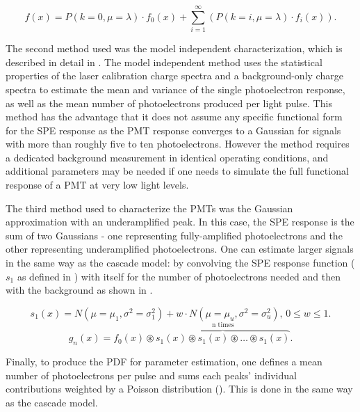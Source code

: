 \begin{equation}
        \label{cascade_fit_full}
        f(x) = P(k=0, \mu=\lambda) \cdot f_0(x) + \sum^{\infty}_{i=1} (P(k=i, \mu=\lambda) \cdot f_i(x)).
\end{equation}

The second method used was the model independent characterization, which is described in detail in .  The model independent method uses the statistical properties of the laser calibration charge spectra and a background-only charge spectra to estimate the mean and variance of the single photoelectron response, as well as the mean number of photoelectrons produced per light pulse. This method has the advantage that it does not assume any specific functional form for the SPE response as the PMT response converges to a Gaussian for signals with more than roughly five to ten photoelectrons. However the method requires a dedicated background measurement in identical operating conditions, and additional parameters may be needed if one needs to simulate the full functional response of a PMT at very low light levels.

The third method used to characterize the PMTs was the Gaussian approximation with an underamplified peak.  In this case, the SPE response is the sum of two  Gaussians - one representing fully-amplified photoelectrons and the other representing underamplified photoelectrons.  One can estimate larger signals in the same way as the cascade model: by convolving the SPE response function ($s_1$ as defined in ) with itself for the number of photoelectrons needed and then with the background as shown in .  


\begin{equation}
        \label{gaussian_spe}
        s_1(x) = N(\mu=\mu_1, \sigma^2=\sigma^2_1) + w \cdot N(\mu=\mu_u, \sigma^2=\sigma^2_u), \, 0 \leq w \leq 1.
\end{equation}
\begin{equation}
        \label{gaussian_mpe}
        g_n(x) = f_0(x) \circledast \overbrace{s_1(x) \circledast s_1(x) \circledast \ldots \circledast s_1(x)}^{\text{n times}}.
\end{equation}

Finally, to produce the PDF for parameter estimation, one defines a mean number of photoelectrons per pulse and sums each peaks' individual contributions weighted by a Poisson distribution ().  This is done in the same way as the cascade model.

